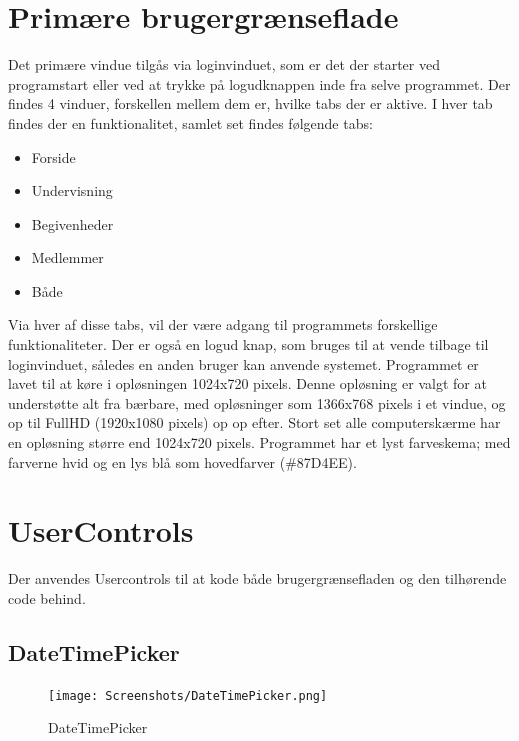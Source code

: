 \section{Primære brugergrænseflade}
Det primære vindue tilgås via loginvinduet, som er det der starter ved programstart eller ved at trykke på logudknappen inde fra selve programmet. 
Der findes 4 vinduer, forskellen mellem dem er, hvilke tabs der er aktive. 
I hver tab findes der en funktionalitet, samlet set findes følgende tabs:
\begin{itemize}%
    \item Forside
    \item Undervisning
    \item Begivenheder
    \item Medlemmer
    \item Både
\end{itemize}

Via hver af disse tabs, vil der være adgang til programmets forskellige funktionaliteter.
Der er også en logud knap, som bruges til at vende tilbage til loginvinduet, således en anden bruger kan anvende systemet.
Programmet er lavet til at køre i opløsningen 1024x720 pixels.
Denne opløsning er valgt for at understøtte alt fra bærbare, med opløsninger som 1366x768 pixels i et vindue, og op til FullHD (1920x1080 pixels) op op efter. 
Stort set alle computerskærme har en opløsning større end 1024x720 pixels\citep{resolutions}. 
Programmet har et lyst farveskema; med farverne hvid og en lys blå som hovedfarver (\#87D4EE).

\section{UserControls}
Der anvendes Usercontrols til at kode både brugergrænsefladen og den tilhørende code behind.


\subsection{DateTimePicker}\label{subsec:DateTimePicker}

\begin{figure}
    \label{img:DateTimePicker}
    \vspace{-20pt}
    \begin{center}
        \texttt{[image: Screenshots/DateTimePicker.png]}
    \end{center}
    \vspace{-15pt}
    \caption{DateTimePicker}
    \vspace{-30pt}
\end{figure}

